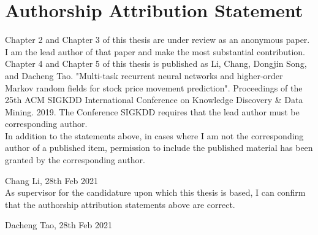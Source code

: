 
\section*{\hfil Authorship Attribution Statement \hfil}

$$$$
Chapter 2 and Chapter 3 of this thesis are under review as an
anonymous paper. I am the lead author of that paper and make the
most substantial contribution.
$$$$
\noindent Chapter 4 and Chapter 5 of this thesis is published as
Li, Chang, Dongjin Song, and Dacheng Tao. "Multi-task recurrent
neural networks and higher-order Markov random fields for stock
price movement prediction". Proceedings of the 25th ACM SIGKDD
International Conference on Knowledge Discovery \& Data Mining.
2019. The Conference SIGKDD requires that the lead author must be
corresponding author.
$$$$
\noindent In addition to the statements above, in cases where I
am not the corresponding author of a published item, permission
to include the published material has been granted by the
corresponding author.

\noindent Chang Li, 28th Feb 2021
$$$$
\noindent As supervisor for the candidature upon which this
thesis is based, I can confirm that the authorship attribution
statements above are correct.

\noindent Dacheng Tao, 28th Feb 2021


